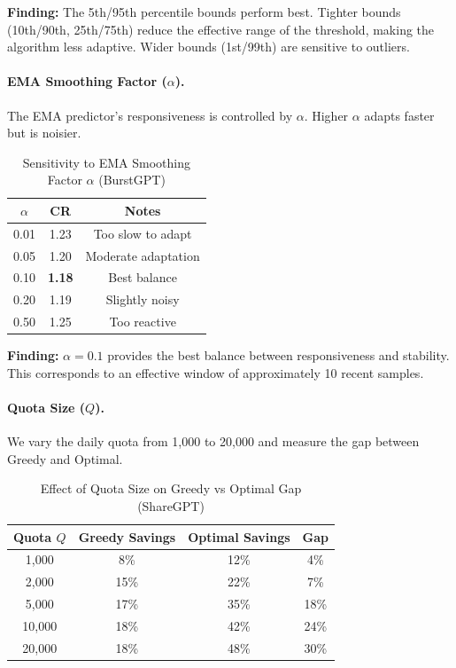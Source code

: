 \textbf{Finding:} The 5th/95th percentile bounds perform best. Tighter bounds (10th/90th, 25th/75th) reduce the effective range of the threshold, making the algorithm less adaptive. Wider bounds (1st/99th) are sensitive to outliers.

\paragraph{EMA Smoothing Factor ($\alpha$).}
The EMA predictor's responsiveness is controlled by $\alpha$. Higher $\alpha$ adapts faster but is noisier.

\begin{table}[h]
\caption{Sensitivity to EMA Smoothing Factor $\alpha$ (BurstGPT)}
\label{tab:alpha_sensitivity}
\begin{center}
\begin{tabular}{ccc}
\toprule
$\alpha$ & CR & Notes \\
\midrule
0.01 & 1.23 & Too slow to adapt \\
0.05 & 1.20 & Moderate adaptation \\
0.10 & \textbf{1.18} & Best balance \\
0.20 & 1.19 & Slightly noisy \\
0.50 & 1.25 & Too reactive \\
\bottomrule
\end{tabular}
\end{center}
\end{table}

\textbf{Finding:} $\alpha = 0.1$ provides the best balance between responsiveness and stability. This corresponds to an effective window of approximately 10 recent samples.

\paragraph{Quota Size ($Q$).}
We vary the daily quota from 1,000 to 20,000 and measure the gap between Greedy and Optimal.

\begin{table}[h]
\caption{Effect of Quota Size on Greedy vs Optimal Gap (ShareGPT)}
\label{tab:quota_sensitivity}
\begin{center}
\begin{tabular}{cccc}
\toprule
Quota $Q$ & Greedy Savings & Optimal Savings & Gap \\
\midrule
1,000 & 8\% & 12\% & 4\% \\
2,000 & 15\% & 22\% & 7\% \\
5,000 & 17\% & 35\% & 18\% \\
10,000 & 18\% & 42\% & 24\% \\
20,000 & 18\% & 48\% & 30\% \\
\bottomrule
\end{tabular}
\end{center}
\end{table}

